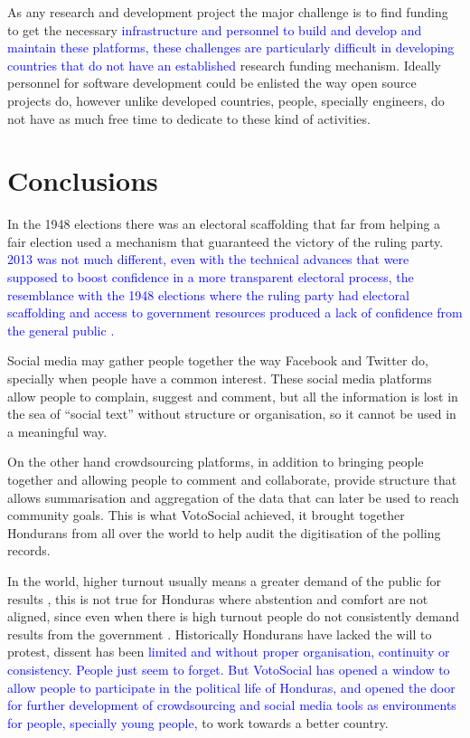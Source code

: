 \documentclass[letterpaper,10pt]{article}
\begin{document}
As any research and development project the major challenge is to find funding to get the necessary \textcolor{blue}{infrastructure and personnel to build and develop and maintain these platforms, these challenges are particularly difficult in developing countries that do not have an established} research funding mechanism. Ideally personnel for software development could be enlisted the way open source projects do, however unlike developed countries, people, specially engineers, do not have as much free time to dedicate to these kind of activities.


\section{Conclusions}


In the 1948 elections there was an electoral scaffolding that far from helping a fair election used a mechanism that guaranteed the victory of the ruling party. \textcolor{blue}{2013 was not much different, even with the technical advances that were supposed to boost confidence in a more transparent electoral process, the resemblance with the 1948 elections where the ruling party had electoral scaffolding and access to government resources produced a lack of confidence from the general public \citep{romero2014}.}

Social media may gather people together the way Facebook and Twitter do, specially when people have a common interest. These social media platforms allow people to complain, suggest and comment, but all the information is lost in the sea of ``social text'' without structure or organisation, so it cannot be used in a meaningful way.

On the other hand crowdsourcing platforms, in addition to bringing people together and allowing people to comment and collaborate, provide structure that allows summarisation and aggregation of the data that can later be used to reach community goals. This is what VotoSocial achieved, it brought together Hondurans from all over the world to help audit the digitisation of the polling records.

In the world, higher turnout usually means a greater demand of the public for results \citep{mac2003}, this is not true for Honduras where abstention and comfort are not aligned, since even when there is high turnout people do not consistently demand results from the government \citep{romero2014}. Historically Hondurans have lacked the will to protest, dissent has been \textcolor{blue}{limited and without proper organisation, continuity or consistency. People just seem to forget. But VotoSocial has opened a window to allow people to participate in the political life of Honduras, and opened the door for further development of crowdsourcing and social media tools as environments for people, specially young people,} to work towards a better country.
\end{document}

